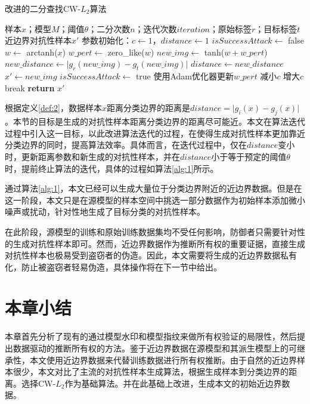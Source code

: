 \begin{algorithm}[H] 
	\small
	\caption{\small 改进的二分查找CW-$L_2$算法}
	\label{alg:1}
	\begin{algorithmic}[1]
		\Require 样本$x$；模型$M$；阈值$\theta$；二分次数$n$；迭代次数$iteration$；原始标签$r$；目标标签$t$
		\Ensure 近边界对抗性样本$x'$
		\State 参数初始化：$c\gets1$，$distance \gets 1$
		\State $isSuccessAttack \gets$ false
		\State $w \gets$ arctanh($x$)
		\State $w\_pert \gets$ zero\_like($w$)
		\State $new\_img \gets$ tanh($w + w\_pert$)
		\State $new\_distance \gets\vert g_r(new\_img) - g_t(new\_img) \vert$
		\State $distance \gets new\_distance$
		\State $x' \gets new\_img$
		\State $isSuccessAttack \gets$ true
		\EndIf
		\State 使用Adam优化器更新$w\_pert$
		\EndFor
		\State 减小$c$
		\Else \State 增大$c$
		\EndIf 
		\State break
		\EndIf
		\EndFor
		\State \textbf{return} $x'$
	\end{algorithmic}
	
\end{algorithm}

根据定义\ref{def:2}，数据样本$x$距离分类边界的距离是$distance = \vert g_i(x) - g_j(x) \vert$。本节的目标是生成的对抗性样本距离分类边界的距离尽可能近。本文在算法迭代过程中引入这一目标，以此改进算法迭代的过程，在使得生成对抗性样本更加靠近分类边界的同时，提高算法效率。具体而言，在迭代过程中，仅在$distance$变小时，更新距离参数和新生成的对抗性样本，并在$distance$小于等于预定的阈值$\theta$时，提前终止算法的迭代，具体的过程如算法\ref{alg:1}所示。





通过算法\ref{alg:1}，本文已经可以生成大量位于分类边界附近的近边界数据。但是在这一阶段，本文只是在源模型的样本空间中挑选一部分数据作为初始样本添加微小噪声或扰动，针对性地生成了目标分类的对抗性样本。

在此阶段，源模型的训练和原始训练数据集均不受任何影响，防御者只需要针对性的生成对抗性样本即可。然而，近边界数据作为推断所有权的重要证据，直接生成对抗性样本也极易受到盗窃者的伪造。因此，本文需要将生成的近边界数据私有化，防止被盗窃者轻易伪造，具体操作将在下一节中给出。

\section{本章小结}

本章首先分析了现有的通过模型水印和模型指纹来做所有权验证的局限性，然后提出数据驱动的推断所有权的方法。鉴于近边界数据在源模型和其派生模型上的可继承性，本文使用近边界数据来代替训练数据进行所有权推断。由于自然的近边界样本很少，本文对比了主流的对抗性样本生成算法，根据生成样本到分类边界的距离。选择CW-$L_2$作为基础算法。并在此基础上改进，生成本文的初始近边界数据。